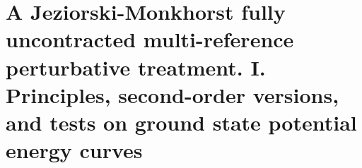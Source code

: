 \documentclass[12pt,a4paper]{report}
\begin{document}
\appendix

\chapter{A Jeziorski-Monkhorst fully uncontracted multi-reference perturbative treatment. I. Principles, second-order versions, and tests on ground state potential energy curves \cite{Giner_2017}}





%
\end{document}

